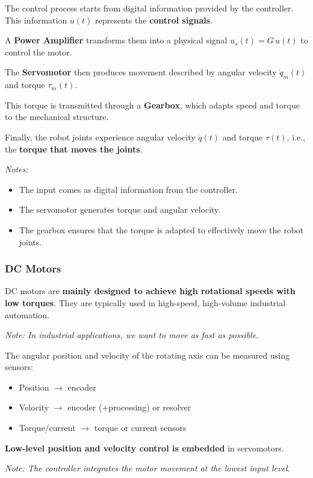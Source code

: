 The control process starts from digital information provided by the controller. 
This information $u(t)$ represents the \textbf{control signals}.

A \textbf{Power Amplifier} transforms them into a physical signal $u_s(t)=G\,u(t)$ to control the motor.

The \textbf{Servomotor} then produces movement described by angular velocity $\dot{q}_m(t)$ and torque $\tau_m(t)$.

This torque is transmitted through a \textbf{Gearbox}, which adapts speed and torque to the mechanical structure.

Finally, the robot joints experience angular velocity $\dot{q}(t)$ and torque $\tau(t)$, i.e., the \textbf{torque that moves the joints}.

\textit{Notes:}
\begin{itemize}
  \item The input comes as digital information from the controller.
  \item The servomotor generates torque and angular velocity.
  \item The gearbox ensures that the torque is adapted to effectively move the robot joints.
\end{itemize}

\hfill

\subsubsection*{DC Motors}

DC motors are \textbf{mainly designed to achieve high rotational speeds with low torques}.  
They are typically used in high-speed, high-volume industrial automation.  

\textit{Note: In industrial applications, we want to move as fast as possible.}

The angular position and velocity of the rotating axis can be measured using sensors:
\begin{itemize}
    \item Position $\rightarrow$ encoder
    \item Velocity $\rightarrow$ encoder (+processing) or resolver
    \item Torque/current $\rightarrow$ torque or current sensors
\end{itemize}

\textbf{Low-level position and velocity control is embedded} in servomotors.  

\textit{Note: The controller integrates the motor movement at the lowest input level.}

